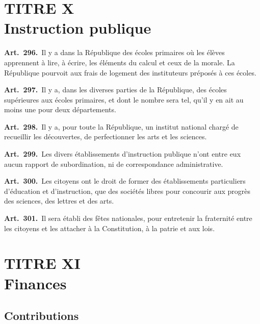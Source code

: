 \documentclass[french,twoside]{book} %
\newcommand{\labelchar}[1]{\textbf{\color{rubric} #1}}
\begin{document}
\section[{TITRE X. Instruction publique}]{TITRE X \\
Instruction publique}

\labelchar{Art. 296.} Il y a dans la République des écoles primaires où les élèves apprennent à lire, à écrire, les éléments du calcul et ceux de la morale. La République pourvoit aux frais de logement des instituteurs préposés à ces écoles.\par
\labelchar{Art. 297.} Il y a, dans les diverses parties de la République, des écoles supérieures aux écoles primaires, et dont le nombre sera tel, qu’il y en ait au moins une pour deux départements.\par
\labelchar{Art. 298.} Il y a, pour toute la République, un institut national chargé de recueillir les découvertes, de perfectionner les arts et les sciences.\par
\labelchar{Art. 299.} Les divers établissements d’instruction publique n’ont entre eux aucun rapport de subordination, ni de correspondance administrative.\par
\labelchar{Art. 300.} Les citoyens ont le droit de former des établissements particuliers d’éducation et d’instruction, que des sociétés libres pour concourir aux progrès des sciences, des lettres et des arts.\par
\labelchar{Art. 301.} Il sera établi des fêtes nationales, pour entretenir la fraternité entre les citoyens et les attacher à la Constitution, à la patrie et aux lois.

\section[{TITRE XI. Finances}]{TITRE XI \\
Finances}


\subsection[{Contributions}]{Contributions}
\end{document}
